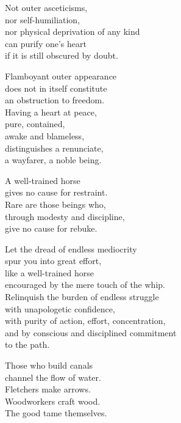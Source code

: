 Not outer asceticisms,\\
nor self-humiliation,\\
nor physical deprivation of any kind\\
can purify one’s heart\\
if it is still obscured by doubt.


Flamboyant outer appearance\\
does not in itself constitute\\
an obstruction to freedom.\\
Having a heart at peace,\\
pure, contained,\\
awake and blameless,\\
distinguishes a renunciate,\\
a wayfarer, a noble being.


A well-trained horse\\
gives no cause for restraint.\\
Rare are those beings who,\\
through modesty and discipline,\\
give no cause for rebuke.


Let the dread of endless mediocrity\\
spur you into great effort,\\
like a well-trained horse\\
encouraged by the mere touch of the whip.\\
Relinquish the burden of endless struggle\\
with unapologetic confidence,\\
with purity of action, effort, concentration,\\
and by conscious and disciplined commitment\\
to the path.


Those who build canals\\
channel the flow of water.\\
Fletchers make arrows.\\
Woodworkers craft wood.\\
The good tame themselves.

